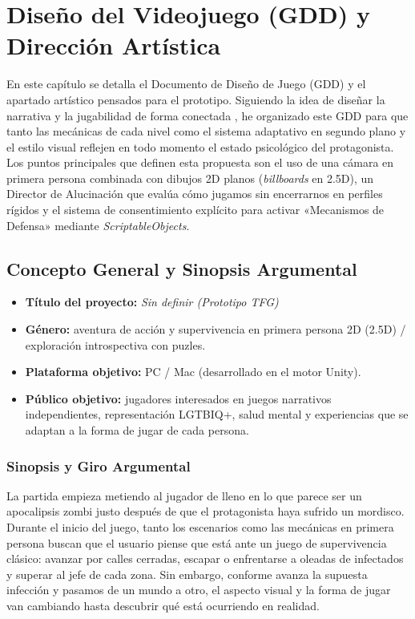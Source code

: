 \chapter{Diseño del Videojuego (GDD) y Dirección Artística}
\label{cap:desarrollo}

En este capítulo se detalla el Documento de Diseño de Juego (\ac{GDD}) y el apartado artístico pensados para el prototipo. Siguiendo la idea de diseñar la narrativa y la jugabilidad de forma conectada \parencite{hernandez2024, navarro2023}, he organizado este \ac{GDD} para que tanto las mecánicas de cada nivel como el sistema adaptativo en segundo plano \parencite{tremblay2010, renderhub2023} y el estilo visual \parencite{finestrat2018, boyero2025} reflejen en todo momento el estado psicológico del protagonista. Los puntos principales que definen esta propuesta son el uso de una cámara en primera persona combinada con dibujos \ac{2D} planos (\textit{billboards} en 2.5D), un Director de Alucinación que evalúa cómo jugamos sin encerrarnos en perfiles rígidos y el sistema de consentimiento explícito para activar «Mecanismos de Defensa» mediante \textit{ScriptableObjects}.

\section{Concepto General y Sinopsis Argumental}
\begin{itemize}
  \item \textbf{Título del proyecto:} \textit{Sin definir (Prototipo TFG)}
  \item \textbf{Género:} aventura de acción y supervivencia en primera persona \ac{2D} (2.5D) / exploración introspectiva con puzles.
  \item \textbf{Plataforma objetivo:} PC / Mac (desarrollado en el motor Unity).
  \item \textbf{Público objetivo:} jugadores interesados en juegos narrativos independientes, representación LGTBIQ+, salud mental y experiencias que se adaptan a la forma de jugar de cada persona.
\end{itemize}

\subsection{Sinopsis y Giro Argumental}
La partida empieza metiendo al jugador de lleno en lo que parece ser un apocalipsis zombi justo después de que el protagonista haya sufrido un mordisco. Durante el inicio del juego, tanto los escenarios como las mecánicas en primera persona buscan que el usuario piense que está ante un juego de supervivencia clásico: avanzar por calles cerradas, escapar o enfrentarse a oleadas de infectados y superar al jefe de cada zona. Sin embargo, conforme avanza la supuesta infección y pasamos de un mundo a otro, el aspecto visual y la forma de jugar van cambiando hasta descubrir qué está ocurriendo en realidad.

